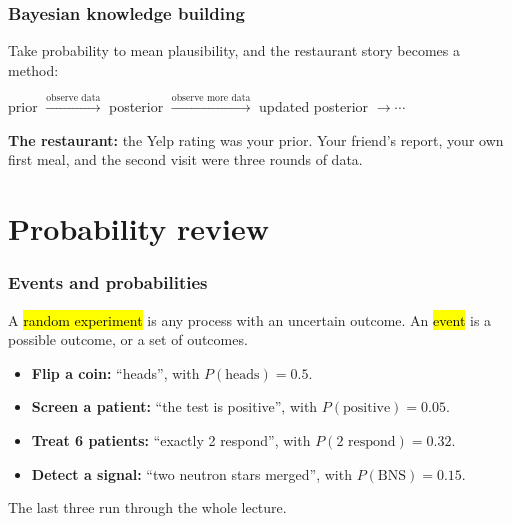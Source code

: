 \documentclass[slidestop,compress,mathserif]{beamer}
\begin{document}
\begin{frame}
\frametitle{Bayesian knowledge building}

Take probability to mean plausibility, and the restaurant story becomes a method:

\medskip

\begin{center}
{\small
prior $\xrightarrow{\text{observe data}}$ posterior $\xrightarrow{\text{observe more data}}$ updated posterior $\longrightarrow \cdots$}
\end{center}

\pause
\medskip


\pause
\medskip

\textbf{The restaurant:} the Yelp rating was your prior. Your friend's report, your own first meal, and the second visit were three rounds of data.

\end{frame}

\section{Probability review}

\begin{frame}
\frametitle{Events and probabilities}

A \hl{random experiment} is any process with an uncertain outcome. An \hl{event} is a possible outcome, or a set of outcomes.

\pause
\medskip

\begin{itemize}
\item \textbf{Flip a coin:} ``heads'', with $P(\text{heads}) = 0.5$.
\item \textbf{Screen a patient:} ``the test is positive'', with $P(\text{positive}) = 0.05$.
\item \textbf{Treat 6 patients:} ``exactly 2 respond'', with $P(2 \text{ respond}) = 0.32$.
\item \textbf{Detect a signal:} ``two neutron stars merged'', with $P(\text{BNS}) = 0.15$.
\end{itemize}

\pause
\medskip

The last three run through the whole lecture.

\end{frame}
\end{document}
